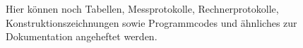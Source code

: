 \label{chap:anhang}
Hier können noch Tabellen, Messprotokolle, Rechnerprotokolle, Konstruktionszeichnungen sowie Programmcodes und ähnliches zur Dokumentation angeheftet werden.